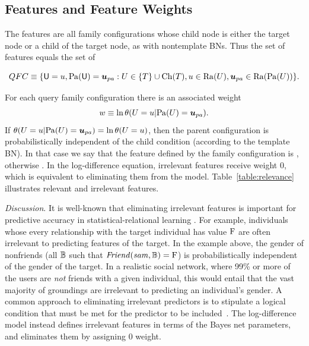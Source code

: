 \documentclass[runningheads,a4paper]{llncs}
\newcommand{\point}[1]{\noindent\emph{#1}.}
\begin{document}
\subsection{Features and Feature Weights} \label{sec:features} The features are all family configurations whose child node is either the target node or a child of the target node, as with nontemplate BNs. Thus the set of features equals the set of 

$$\QFC \equiv \{\Appendterm{\UI  = \UV} {\Pa{\UI} = \Prange{\UT}}: \UT \in \{\TT\} \cup \Ch{\TT}, \UV \in \Range{\UT}, \Prange{\UT} \in  \Range{\Pa{\UT}}\}.$$

 For each query family configuration 
there is an associated weight $$w \equiv  \ln \cprob{\UT = \UV}{\Pa{\UT} = \Prange{\UT}}  .$$ 
%
If $\cprob{\UT = \UV}{\Pa{\UT} = \Prange{\UT}} = \ln \jprob{\UT = \UV}$, then the parent configuration is probabilistically independent of the child condition (according to the template BN). In that case we say that the feature defined by the family configuration is , otherwise . In the log-difference equation, irrelevant features receive weight 0, which is equivalent to eliminating them from the model. Table~\ref{table:relevance} illustrates relevant and irrelevant features.


\point{Discussion} It is well-known that eliminating irrelevant features is important for predictive accuracy in statistical-relational learning \cite{Getoor2007c,Ngo1997,Natarajan2008,Heckerman+al:SRL07}. For example, individuals whose every relationship with the target individual has value $\mathrm{F}$ are often irrelevant to predicting features of the target. In the example above, the gender of nonfriends (all $\mathbb{B}$ such that $\it{Friend}(sam, \mathbb{B}) = \mathrm{F}$) is probabilistically independent of the gender of the target. In a realistic social network, where 99\% or more of the users are {\em not} friends with a given individual, this would entail that the vast majority of groundings are irrelevant to predicting an individual's gender. A common approach to eliminating irrelevant predictors
is to stipulate a logical condition that must be met for the predictor to be included~\cite{Ngo1997,Natarajan2008,Russell2010,Getoor2006}. The log-difference model instead defines irrelevant features in terms of the Bayes net parameters, and eliminates them by assigning 0 weight.
\end{document}
